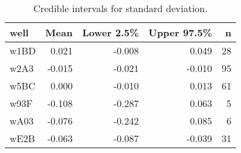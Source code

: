 \begin{table}[ht]
\centering
\begin{tabular}{lrrrr}
  \hline
well & Mean & Lower 2.5\% & Upper 97.5\% & n \\ 
  \hline
w1BD & 0.021 & -0.008 & 0.049 &   28 \\ 
  w2A3 & -0.015 & -0.021 & -0.010 &   95 \\ 
  w5BC & 0.000 & -0.010 & 0.013 &   61 \\ 
  w93F & -0.108 & -0.287 & 0.063 &    5 \\ 
  wA03 & -0.076 & -0.242 & 0.085 &    6 \\ 
  wE2B & -0.063 & -0.087 & -0.039 &   31 \\ 
   \hline
\end{tabular}
\caption{Credible intervals for standard deviation.} 
\label{tab:sd}
\end{table}
